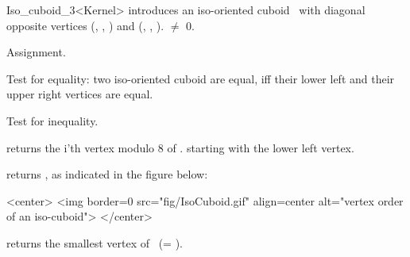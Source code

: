 \begin{ccRefClass} {Iso_cuboid_3<Kernel>}
            {introduces an iso-oriented cuboid \ccVar\ with diagonal
             opposite vertices 
             (, , ) and
             (, , ).  
             \ccPrecond {} $\neq$ 0.}


\ccOperations
\ccHidden {}
        {Assignment.}

       {Test for equality: two iso-oriented cuboid are equal, iff their
        lower left and their upper right vertices are equal.}

       {Test for inequality.}

       {returns the i'th vertex modulo 8  of \ccVar.
        starting with the lower left vertex.}

       {returns  , as indicated in the figure below:
       }

\begin{ccHtmlOnly}
<center>
<img border=0 src="fig/IsoCuboid.gif" align=center alt="vertex order of
  an iso-cuboid">
</center>
\end{ccHtmlOnly} 


       {returns the smallest vertex of \ccVar\ (= ).}



\end{ccRefClass}
